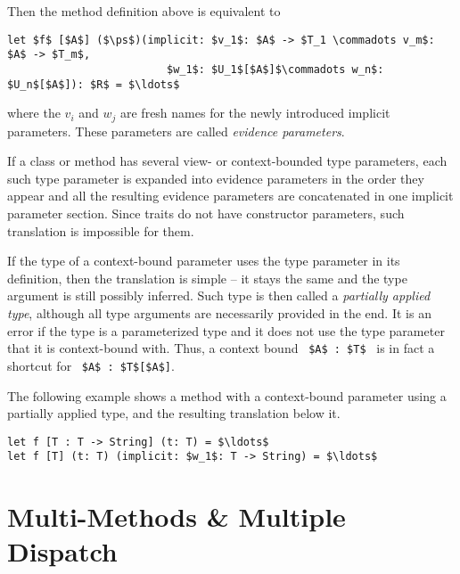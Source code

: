 Then the method definition above is equivalent to
\begin{lstlisting}
let $f$ [$A$] ($\ps$)(implicit: $v_1$: $A$ -> $T_1 \commadots v_m$: $A$ -> $T_m$,
                         $w_1$: $U_1$[$A$]$\commadots w_n$: $U_n$[$A$]): $R$ = $\ldots$
\end{lstlisting}
where the $v_i$ and $w_j$ are fresh names for the newly introduced implicit parameters. These parameters are called {\em evidence parameters}. 

If a class or method has several view- or context-bounded type parameters, each such type parameter is expanded into evidence parameters in the order they appear and all the resulting evidence parameters are concatenated in one implicit parameter section. Since traits do not have constructor parameters, such translation is impossible for them. 

If the type of a context-bound parameter uses the type parameter in its definition, then the translation is simple -- it stays the same and the type argument is still possibly inferred. Such type is then called a {\em partially applied type}, although all type arguments are necessarily provided in the end. It is an error if the type is a parameterized type and it does not use the type parameter that it is context-bound with. Thus, a context bound ~\lstinline!$A$ : $T$!~ is in fact a shortcut for ~\lstinline!$A$ : $T$[$A$]!. 

\example The following example shows a method with a context-bound parameter using a partially applied type, and the resulting translation below it. 
\begin{lstlisting}
let f [T : T -> String] (t: T) = $\ldots$
let f [T] (t: T) (implicit: $w_1$: T -> String) = $\ldots$
\end{lstlisting}





\section{Multi-Methods \& Multiple Dispatch}
\label{sec:multi-methods}

